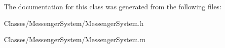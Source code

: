 The documentation for this class was generated from the following files:\begin{DoxyCompactItemize}
\item 
Classes/MessengerSystem/MessengerSystem.h\item 
Classes/MessengerSystem/MessengerSystem.m\end{DoxyCompactItemize}
